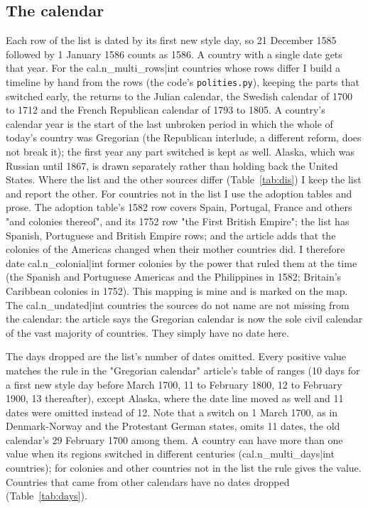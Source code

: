 \documentclass[11pt,a4paper]{article}
\begin{document}
\subsection{The calendar}
Each row of the list is dated by its first new style day, so 21 December 1585 followed by 1 January 1586 counts as 1586. A country with a single date gets that year. For the {{cal.n_multi_rows|int}} countries whose rows differ I build a timeline by hand from the rows (the code's \texttt{polities.py}), keeping the parts that switched early, the returns to the Julian calendar, the Swedish calendar of 1700 to 1712 and the French Republican calendar of 1793 to 1805. A country's calendar year is the start of the last unbroken period in which the whole of today's country was Gregorian (the Republican interlude, a different reform, does not break it); the first year any part switched is kept as well. Alaska, which was Russian until 1867, is drawn separately rather than holding back the United States. Where the list and the other sources differ (Table~\ref{tab:dis}) I keep the list and report the other. For countries not in the list I use the adoption tables and prose. The adoption table's 1582 row covers Spain, Portugal, France and others "and colonies thereof", and its 1752 row "the First British Empire"; the list has Spanish, Portuguese and British Empire rows; and the article adds that the colonies of the Americas changed when their mother countries did. I therefore date {{cal.n_colonial|int}} former colonies by the power that ruled them at the time (the Spanish and Portuguese Americas and the Philippines in 1582; Britain's Caribbean colonies in 1752). This mapping is mine and is marked on the map. The {{cal.n_undated|int}} countries the sources do not name are not missing from the calendar: the article says the Gregorian calendar is now the sole civil calendar of the vast majority of countries. They simply have no date here.

The days dropped are the list's number of dates omitted. Every positive value matches the rule in the "Gregorian calendar" article's table of ranges (10 days for a first new style day before March 1700, 11 to February 1800, 12 to February 1900, 13 thereafter), except Alaska, where the date line moved as well and 11 dates were omitted instead of 12. Note that a switch on 1 March 1700, as in Denmark-Norway and the Protestant German states, omits 11 dates, the old calendar's 29 February 1700 among them. A country can have more than one value when its regions switched in different centuries ({{cal.n_multi_days|int}} countries); for colonies and other countries not in the list the rule gives the value. Countries that came from other calendars have no dates dropped (Table~\ref{tab:days}).
\end{document}
